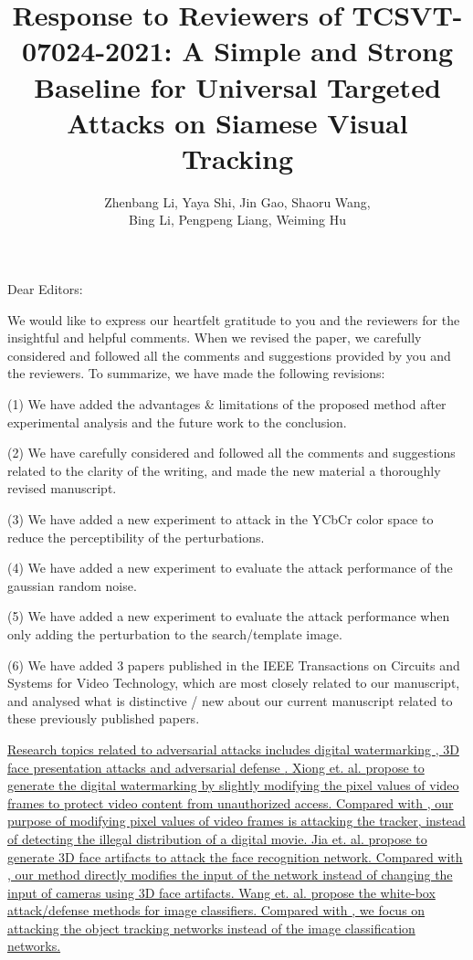 \documentclass[12pt]{article}
\begin{document}
\linespread{1}
\title{Response to Reviewers of TCSVT-07024-2021: A Simple and Strong Baseline for Universal Targeted Attacks on Siamese Visual Tracking}
\author{Zhenbang Li, Yaya Shi, Jin Gao, Shaoru Wang, \\Bing Li, Pengpeng Liang, Weiming Hu}
\date{}
\maketitle

\noindent Dear Editors:

We would like to express our heartfelt gratitude to you and the reviewers for the insightful and helpful comments. When we revised the paper, we carefully considered and followed all the comments and suggestions provided by you and the reviewers. To summarize, we have made the following revisions:

(1) We have added the advantages \& limitations of the proposed method after experimental analysis and the future work to the conclusion.

(2) We have carefully considered and followed all the comments and suggestions related to the clarity of the writing, and made the new material a thoroughly revised manuscript.

(3) We have added a new experiment to attack in the YCbCr color space to reduce the perceptibility of the perturbations.


(4) We have added a new experiment to evaluate the attack performance of the gaussian random noise.

(5) We have added a new experiment to evaluate the attack performance when only adding the perturbation to the search/template image.

(6) We have added 3 papers published in the IEEE Transactions on Circuits and Systems for Video Technology, which are most closely related to our manuscript, and analysed what is distinctive / new about our current manuscript related to these previously published papers.

\uline{
Research topics related to adversarial attacks includes digital watermarking \cite{9343885}, 3D face presentation attacks \cite{9294085} and adversarial defense \cite{9169672}.
Xiong et. al. \cite{9343885} propose to generate the digital watermarking by slightly modifying the pixel values of video frames to protect video content from unauthorized access. Compared with \cite{9343885}, our purpose of modifying pixel values of video frames is attacking the tracker, instead of detecting the illegal distribution of a digital movie.
Jia et. al. \cite{9294085} propose to generate 3D face artifacts to attack the face recognition network. Compared with \cite{9294085}, our method directly modifies the input of the network instead of changing the input of cameras using 3D face artifacts.
Wang et. al. \cite{9169672} propose the white-box attack/defense methods for image classifiers. Compared with \cite{9169672}, we focus on attacking the object tracking networks instead of the image classification networks.
}
\end{document}
